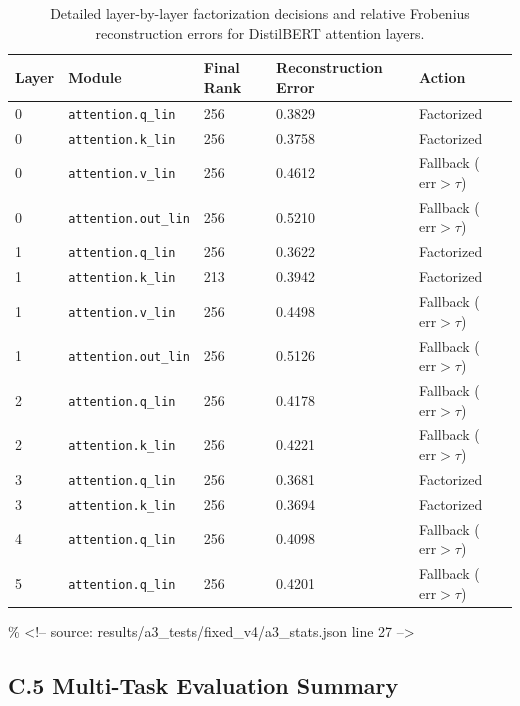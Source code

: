 \begin{table}[H]
\centering
\small
\begin{tabular}{lllll}
\toprule
\textbf{Layer} & \textbf{Module} & \textbf{Final Rank} & \textbf{Reconstruction Error} & \textbf{Action} \\
\midrule
0 & \texttt{attention.q\_lin} & 256 & 0.3829 & Factorized \\
0 & \texttt{attention.k\_lin} & 256 & 0.3758 & Factorized \\
0 & \texttt{attention.v\_lin} & 256 & 0.4612 & Fallback ($\mathrm{err} > \tau$) \\
0 & \texttt{attention.out\_lin} & 256 & 0.5210 & Fallback ($\mathrm{err} > \tau$) \\
1 & \texttt{attention.q\_lin} & 256 & 0.3622 & Factorized \\
1 & \texttt{attention.k\_lin} & 213 & 0.3942 & Factorized \\
1 & \texttt{attention.v\_lin} & 256 & 0.4498 & Fallback ($\mathrm{err} > \tau$) \\
1 & \texttt{attention.out\_lin} & 256 & 0.5126 & Fallback ($\mathrm{err} > \tau$) \\
2 & \texttt{attention.q\_lin} & 256 & 0.4178 & Fallback ($\mathrm{err} > \tau$) \\
2 & \texttt{attention.k\_lin} & 256 & 0.4221 & Fallback ($\mathrm{err} > \tau$) \\
3 & \texttt{attention.q\_lin} & 256 & 0.3681 & Factorized \\
3 & \texttt{attention.k\_lin} & 256 & 0.3694 & Factorized \\
4 & \texttt{attention.q\_lin} & 256 & 0.4098 & Fallback ($\mathrm{err} > \tau$) \\
5 & \texttt{attention.q\_lin} & 256 & 0.4201 & Fallback ($\mathrm{err} > \tau$) \\
\bottomrule
\end{tabular}
\caption{Detailed layer-by-layer factorization decisions and relative Frobenius reconstruction errors for DistilBERT attention layers.}
\label{tab:distilbert_layer_detail}
\end{table}
\% \textless{}!-- source: results/a3\_tests/fixed\_v4/a3\_stats.json line 27 --\textgreater{}

\subsection{C.5 Multi-Task Evaluation Summary}

